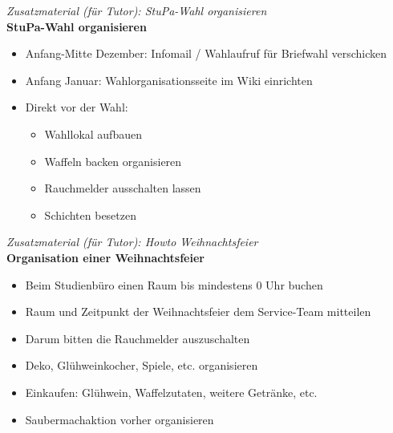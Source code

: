 \documentclass[a4paper,11pt]{scrartcl} %
\begin{document}
\begin{framed}
\textit{Zusatzmaterial (für Tutor): StuPa-Wahl organisieren} \\

\textbf{StuPa-Wahl organisieren} \\
\begin{itemize}
\item Anfang-Mitte Dezember: Infomail / Wahlaufruf für Briefwahl verschicken
\item Anfang Januar: Wahlorganisationsseite im Wiki einrichten
\item Direkt vor der Wahl: 
\begin{itemize}
\item Wahllokal aufbauen 
\item Waffeln backen organisieren
\item Rauchmelder ausschalten lassen
\item Schichten besetzen
\end{itemize}
\end{itemize}
\end{framed}

\begin{framed}
\textit{Zusatzmaterial (für Tutor): Howto Weihnachtsfeier}\\

\textbf{Organisation einer Weihnachtsfeier}\\
\begin{itemize}
\item Beim Studienbüro einen Raum bis mindestens 0 Uhr buchen
\item Raum und Zeitpunkt der Weihnachtsfeier dem Service-Team mitteilen
\item Darum bitten die Rauchmelder auszuschalten
\item Deko, Glühweinkocher, Spiele, etc. organisieren
\item Einkaufen: Glühwein, Waffelzutaten, weitere Getränke, etc.
\item Saubermachaktion vorher organisieren
\end{itemize}
\end{framed}
\end{document}
